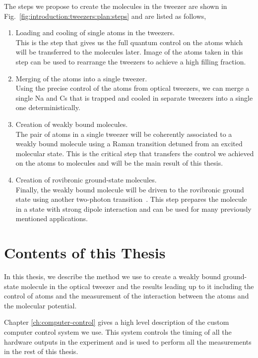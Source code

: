 The steps we propose to create the molecules in the tweezer are shown in
Fig.~\ref{fig:introduction:tweezers:plan:steps} and are listed as follows,
\begin{enumerate}
\item Loading and cooling of single atoms in the tweezers.\\
  This is the step that gives us the full quantum control on the atoms
  which will be transferred to the molecules later.
  Image of the atoms taken in this step can be used to rearrange the tweezers
  to achieve a high filling fraction.
\item Merging of the atoms into a single tweezer.\\
  Using the precise control of the atoms from optical tweezers,
  we can merge a single Na and Cs that is trapped and cooled in separate tweezers
  into a single one deterministically.
\item Creation of weakly bound molecules.\\
  The pair of atoms in a single tweezer will be coherently associated
  to a weakly bound molecule using a Raman transition detuned from an excited molecular state.
  This is the critical step that transfers the control we achieved
  on the atoms to molecules and will be the main result of this thesis.
\item Creation of rovibronic ground-state molecules.\\
  Finally, the weakly bound molecule will be driven to the rovibronic ground state
  using another two-photon transition~\cite{bergmann_coherent_1998}.
  This step prepares the molecule in a state with strong dipole interaction
  and can be used for many previously mentioned applications.
\end{enumerate}

\section{Contents of this Thesis}
\label{ch:introduction:contents}

In this thesis, we describe the method we use to create a weakly bound ground-state molecule
in the optical tweezer and the results leading up to it including the control of atoms
and the measurement of the interaction between the atoms and the molecular potential.

Chapter \ref{ch:computer-control} gives a high level description of
the custom computer control system we use.
This system controls the timing of all the hardware outputs in the experiment
and is used to perform all the measurements in the rest of this thesis.

